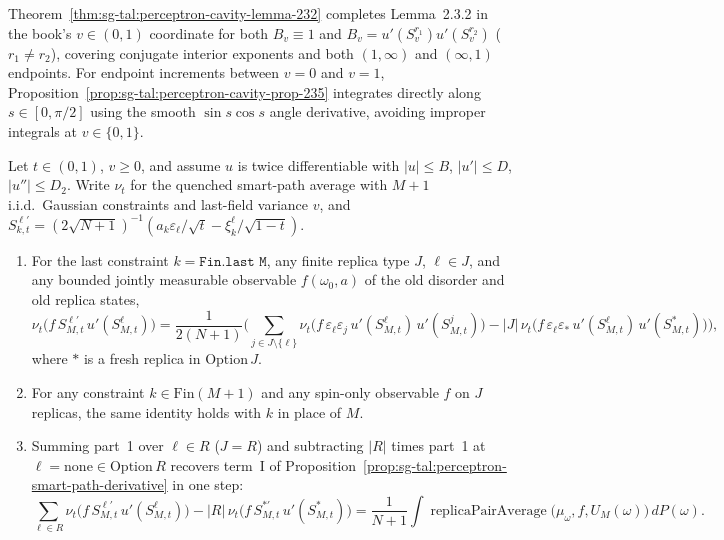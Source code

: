 \begin{remark}\label{rem:sg-tal:perceptron-lemma-232-status}
Theorem~\ref{thm:sg-tal:perceptron-cavity-lemma-232} completes Lemma~2.3.2 in the book's $v\in(0,1)$ coordinate for both
$B_v\equiv1$ and $B_v=u'(S_v^{r_1})u'(S_v^{r_2})$ ($r_1\ne r_2$), covering conjugate interior exponents and both $(1,\infty)$ and
$(\infty,1)$ endpoints. For endpoint increments between $v=0$ and $v=1$, Proposition~\ref{prop:sg-tal:perceptron-cavity-prop-235}
integrates directly along $s\in[0,\pi/2]$ using the smooth $\sin s\cos s$ angle derivative, avoiding improper integrals at $v\in\{0,1\}$.
\end{remark}

\begin{lemma}\label{lem:sg-tal:perceptron-exercise-233}
  \leanok
Let $t\in(0,1)$, $v\ge0$, and assume $u$ is twice differentiable with $|u|\le B$, $|u'|\le D$, $|u''|\le D_2$. Write $\nu_t$ for the
quenched smart-path average with $M+1$ i.i.d.\ Gaussian constraints and last-field variance $v$, and
$S^{\ell\prime}_{k,t}=(2\sqrt{N+1})^{-1}(a_k\varepsilon_\ell/\sqrt t-\xi^\ell_k/\sqrt{1-t})$.
\begin{enumerate}
\item For the last constraint $k=\texttt{Fin.last M}$, any finite replica type $J$, $\ell\in J$, and any bounded jointly measurable
observable $f(\omega_0,a)$ of the old disorder and old replica states,
\[
 \nu_t\bigl(f\,S^{\ell\prime}_{M,t}\,u'(S^\ell_{M,t})\bigr)
 =\frac{1}{2(N+1)}\Biggl(\sum_{j\in J\setminus\{\ell\}}\nu_t\bigl(f\,\varepsilon_\ell\varepsilon_j\,u'(S^\ell_{M,t})\,u'(S^j_{M,t})\bigr)
 -|J|\,\nu_t\bigl(f\,\varepsilon_\ell\varepsilon_*\,u'(S^\ell_{M,t})\,u'(S^*_{M,t})\bigr)\Biggr),
\]
where $*$ is a fresh replica in $\mathrm{Option}\,J$.
\item For any constraint $k\in\mathrm{Fin}(M+1)$ and any spin-only observable $f$ on $J$ replicas, the same identity holds with $k$ in place of $M$.
\item Summing part~1 over $\ell\in R$ ($J=R$) and subtracting $|R|$ times part~1 at $\ell=\mathrm{none}\in\mathrm{Option}\,R$ recovers
term~$\mathrm{I}$ of Proposition~\ref{prop:sg-tal:perceptron-smart-path-derivative} in one step:
\[
 \sum_{\ell\in R}\nu_t\bigl(f\,S^{\ell\prime}_{M,t}\,u'(S^\ell_{M,t})\bigr)
 -|R|\,\nu_t\bigl(f\,S^{*\prime}_{M,t}\,u'(S^*_{M,t})\bigr)
 =\frac{1}{N+1}\int\operatorname{replicaPairAverage}\bigl(\mu_\omega,f,U_M(\omega)\bigr)\,dP(\omega).
\]
\end{enumerate}
\end{lemma}
